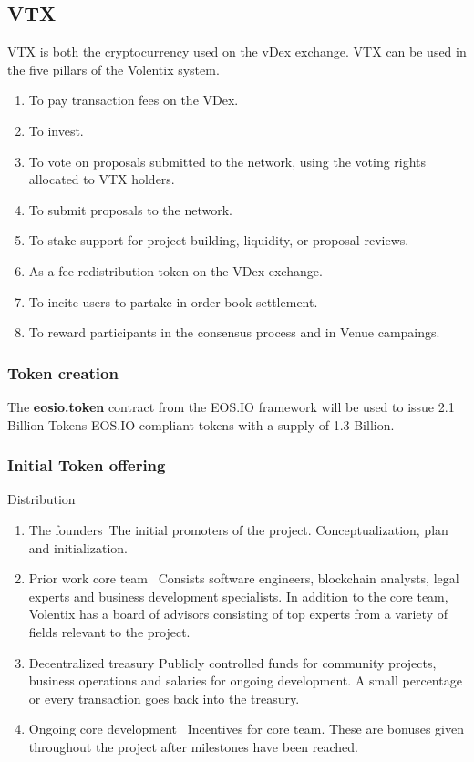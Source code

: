 \documentclass[]{article}
\begin{document}
\subsection{VTX}
VTX is both the cryptocurrency used on the vDex exchange. 
VTX can be used in the five pillars of the Volentix system.

\begin{enumerate}
\item To pay transaction fees on the VDex.
\item To invest. 
\item To vote on proposals submitted to the network, using the voting rights allocated to VTX holders.
\item To submit proposals to the network.
\item To stake support for project building, liquidity, or proposal reviews. 
\item As a fee redistribution token on the VDex exchange.
\item To incite users to partake in order book settlement.
\item To reward participants in the consensus process and in Venue campaings.
\end{enumerate}



\subsubsection{Token creation}
The \textbf{eosio.token} contract from the EOS.IO framework will be used to issue 2.1 Billion Tokens EOS.IO compliant tokens 
with a supply of 1.3 Billion.
 
 
\subsubsection{Initial Token offering}
 
Distribution
\begin{enumerate}
\item The founders\
The initial promoters of the project. 
Conceptualization, plan and initialization.	
\item Prior work core team \
Consists software engineers, blockchain analysts, legal experts and business development specialists. 
In addition to the core team, Volentix has a board of advisors consisting of top experts from a variety of fields relevant to the project.
\item Decentralized treasury
Publicly controlled funds for community projects, business operations and salaries for ongoing development. 
A small percentage or every transaction goes back into the treasury.
\item Ongoing core development \
Incentives for core team. These are bonuses given throughout the project after milestones have been reached.
\end{enumerate}
	
\end{document}
